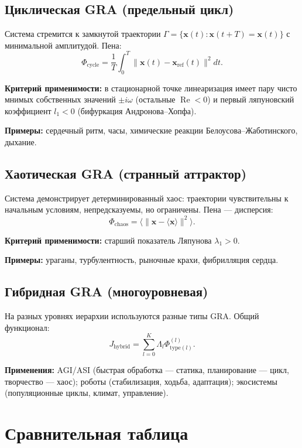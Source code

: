 \documentclass[12pt,a4paper]{article}
\begin{document}
\subsection{Циклическая GRA (предельный цикл)}

Система стремится к замкнутой траектории \(\Gamma = \{\mathbf{x}(t): \mathbf{x}(t+T)=\mathbf{x}(t)\}\) с минимальной амплитудой. Пена:
\[
\Phi_{\text{cycle}} = \frac{1}{T}\int_0^T \|\mathbf{x}(t)-\mathbf{x}_{\text{ref}}(t)\|^2 dt.
\]

\textbf{Критерий применимости:} в стационарной точке линеаризация имеет пару чисто мнимых собственных значений \(\pm i\omega\) (остальные \(\operatorname{Re}<0\)) и первый ляпуновский коэффициент \(l_1 < 0\) (бифуркация Андронова–Хопфа).

\textbf{Примеры:} сердечный ритм, часы, химические реакции Белоусова–Жаботинского, дыхание.

\subsection{Хаотическая GRA (странный аттрактор)}

Система демонстрирует детерминированный хаос: траектории чувствительны к начальным условиям, непредсказуемы, но ограничены. Пена — дисперсия:
\[
\Phi_{\text{chaos}} = \langle \|\mathbf{x} - \langle\mathbf{x}\rangle\|^2 \rangle.
\]

\textbf{Критерий применимости:} старший показатель Ляпунова \(\lambda_1 > 0\).

\textbf{Примеры:} ураганы, турбулентность, рыночные крахи, фибрилляция сердца.

\subsection{Гибридная GRA (многоуровневая)}

На разных уровнях иерархии используются разные типы GRA. Общий функционал:
\[
J_{\text{hybrid}} = \sum_{l=0}^K \Lambda_l \Phi_{\text{type}(l)}^{(l)}.
\]

\textbf{Применения:} AGI/ASI (быстрая обработка — статика, планирование — цикл, творчество — хаос); роботы (стабилизация, ходьба, адаптация); экосистемы (популяционные циклы, климат, управление).

\section{Сравнительная таблица}
\end{document}
